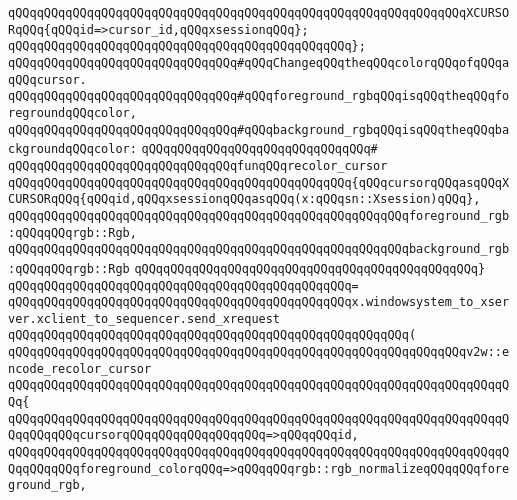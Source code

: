 \newline
\verb|qQQqqQQqqQQqqQQqqQQqqQQqqQQqqQQqqQQqqQQqqQQqqQQqqQQqqQQqqQQqqQQqXCURSORqQQq{qQQqid=>cursor_id,qQQqxsessionqQQq};|\newline
\verb|qQQqqQQqqQQqqQQqqQQqqQQqqQQqqQQqqQQqqQQqqQQqqQQq};|\newline
\newline
\verb|qQQqqQQqqQQqqQQqqQQqqQQqqQQqqQQq#qQQqChangeqQQqtheqQQqcolorqQQqofqQQqaqQQqcursor.|\newline
\verb|qQQqqQQqqQQqqQQqqQQqqQQqqQQqqQQq#qQQqforeground_rgbqQQqisqQQqtheqQQqforegroundqQQqcolor,|\newline
\verb|qQQqqQQqqQQqqQQqqQQqqQQqqQQqqQQq#qQQqbackground_rgbqQQqisqQQqtheqQQqbackgroundqQQqcolor:|\newline
\verb|qQQqqQQqqQQqqQQqqQQqqQQqqQQqqQQq#|\newline
\verb|qQQqqQQqqQQqqQQqqQQqqQQqqQQqqQQqfunqQQqrecolor_cursor|\newline
\verb|qQQqqQQqqQQqqQQqqQQqqQQqqQQqqQQqqQQqqQQqqQQqqQQq{qQQqcursorqQQqasqQQqXCURSORqQQq{qQQqid,qQQqxsessionqQQqasqQQq(x:qQQqsn::Xsession)qQQq},|\newline
\verb|qQQqqQQqqQQqqQQqqQQqqQQqqQQqqQQqqQQqqQQqqQQqqQQqqQQqqQQqforeground_rgb:qQQqqQQqrgb::Rgb,|\newline
\verb|qQQqqQQqqQQqqQQqqQQqqQQqqQQqqQQqqQQqqQQqqQQqqQQqqQQqqQQqbackground_rgb:qQQqqQQqrgb::Rgb|\newline
\verb|qQQqqQQqqQQqqQQqqQQqqQQqqQQqqQQqqQQqqQQqqQQqqQQq}|\newline
\verb|qQQqqQQqqQQqqQQqqQQqqQQqqQQqqQQqqQQqqQQqqQQqqQQq=|\newline
\verb|qQQqqQQqqQQqqQQqqQQqqQQqqQQqqQQqqQQqqQQqqQQqqQQqx.windowsystem_to_xserver.xclient_to_sequencer.send_xrequest|\newline
\verb|qQQqqQQqqQQqqQQqqQQqqQQqqQQqqQQqqQQqqQQqqQQqqQQqqQQqqQQq(|\newline
\verb|qQQqqQQqqQQqqQQqqQQqqQQqqQQqqQQqqQQqqQQqqQQqqQQqqQQqqQQqqQQqqQQqv2w::encode_recolor_cursor|\newline
\verb|qQQqqQQqqQQqqQQqqQQqqQQqqQQqqQQqqQQqqQQqqQQqqQQqqQQqqQQqqQQqqQQqqQQqqQQq{|\newline
\verb|qQQqqQQqqQQqqQQqqQQqqQQqqQQqqQQqqQQqqQQqqQQqqQQqqQQqqQQqqQQqqQQqqQQqqQQqqQQqqQQqcursorqQQqqQQqqQQqqQQqqQQq=>qQQqqQQqid,|\newline
\verb|qQQqqQQqqQQqqQQqqQQqqQQqqQQqqQQqqQQqqQQqqQQqqQQqqQQqqQQqqQQqqQQqqQQqqQQqqQQqqQQqforeground_colorqQQq=>qQQqqQQqrgb::rgb_normalizeqQQqqQQqforeground_rgb,|\newline
